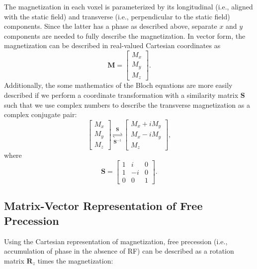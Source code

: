 \documentclass[11pt]{article}
\theoremstyle{definition}
\begin{document}
The magnetization in each voxel is parameterized by its longitudinal (i.e., aligned with the static field) and transverse (i.e., perpendicular to the static field) components. Since the latter has a phase as described above, separate $x$ and $y$ components are needed to fully describe the magnetization. In vector form, the magnetization can be described in real-valued Cartesian coordinates as 
\begin{equation}
    \mathbf{M} = \begin{bmatrix}
        M_x\\
        M_y\\
        M_z
    \end{bmatrix}.
\end{equation}
Additionally, the some mathematics of the Bloch equations are more easily described if we perform a coordinate transformation with a similarity matrix $\mathbf{S}$ such that we use complex numbers to describe the transverse magnetization as a complex conjugate pair:
\begin{equation}
\begin{bmatrix}
        M_x\\
        M_y\\
        M_z
    \end{bmatrix} \underset{\mathbf{S}^{-1}}{\stackrel{\mathbf{S}}{\rightleftharpoons}} \begin{bmatrix}
        M_x + iM_y\\
        M_x - iM_y\\
        M_z
    \end{bmatrix},
\end{equation}
where 
\begin{equation}
    \mathbf{S} = \begin{bmatrix}
        1 & i & 0 \\
        1 & -i & 0 \\
        0 & 0 & 1
    \end{bmatrix}.
\end{equation}

\subsection{Matrix-Vector Representation of Free Precession}

Using the Cartesian representation of magnetization, free precession (i.e., accumulation of phase in the absence of RF) can be described as a rotation matrix $\mathbf{R}_z$ times the magnetization: 
\end{document}
